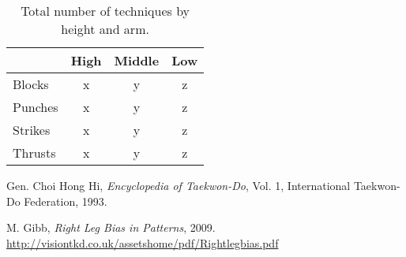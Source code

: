 \documentclass[10pt,twocolumn,a4paper]{article}
\begin{document}
\begin{table}
  \centering
  \begin{tabular}{l|c|c|c} \hline \hline
    & High & Middle & Low \\ \hline

    Blocks    & x   & y   & z \\
    Punches   & x   & y   & z \\
    Strikes   & x   & y   & z \\
    Thrusts   & x   & y   & z \\
    \hline

  \end{tabular}
  \caption{Total number of techniques by height and arm.}
  \end{table}







\begin{thebibliography}{99}
    \small  %

      Gen. Choi Hong Hi,
      \emph{Encyclopedia of Taekwon-Do}, Vol. 1,
      International Taekwon-Do Federation, 1993.

      M. Gibb,
      \emph{Right Leg Bias in Patterns}, 2009.
      \url{http://visiontkd.co.uk/assetshome/pdf/Rightlegbias.pdf}

\end{thebibliography}
\end{document}
